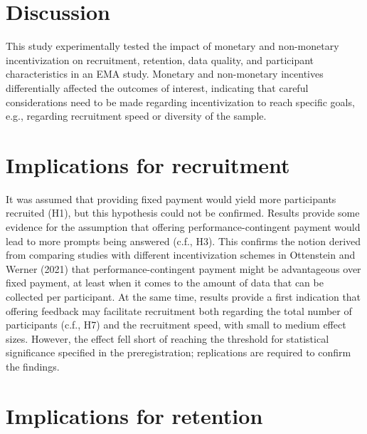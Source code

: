 \documentclass[authordate, empirical]{jote-new-article}
\begin{document}
	\section{\textbf{Discussion}}



	This study experimentally tested the impact of monetary and non-monetary incentivization on recruitment, retention, data quality, and participant characteristics in an EMA study. Monetary and non-monetary incentives differentially affected the outcomes of interest, indicating that careful considerations need to be made regarding incentivization to reach specific goals, e.g., regarding recruitment speed or diversity of the sample.



	\section{\textbf{Implications for recruitment}}



	It was assumed that providing fixed payment would yield more participants recruited (H1), but this hypothesis could not be confirmed. Results provide some evidence for the assumption that offering performance-contingent payment would lead to more prompts being answered (c.f., H3). This confirms the notion derived from comparing studies with different incentivization schemes in Ottenstein and Werner (2021) that performance-contingent payment might be advantageous over fixed payment, at least when it comes to the amount of data that can be collected per participant. At the same time, results provide a first indication that offering feedback may facilitate recruitment both regarding the total number of participants (c.f., H7) and the recruitment speed, with small to medium effect sizes. However, the effect fell short of reaching the threshold for statistical significance specified in the preregistration; replications are required to confirm the findings.



	\section{\textbf{Implications for retention}}
\end{document}
